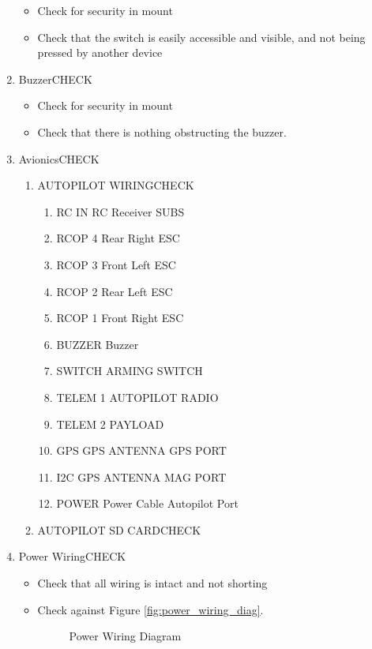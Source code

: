 \documentclass{report}
\begin{document}
\begin{enumerate}
\begin{itemize}
					\item Check for security in mount
					\item Check that the switch is easily accessible and visible, and not being pressed by another device
				\end{itemize}
			\item Buzzer\hrulefill CHECK
				\begin{itemize}
					\item Check for security in mount
					\item Check that there is nothing obstructing the buzzer.
				\end{itemize}
			\item Avionics\hrulefill CHECK
				\begin{enumerate}
					\item AUTOPILOT WIRING\hrulefill CHECK
						\begin{enumerate}
							\item RC IN \dotfill RC Receiver SUBS
							\item RCOP 4 \dotfill Rear Right ESC
							\item RCOP 3 \dotfill Front Left ESC
							\item RCOP 2 \dotfill Rear Left ESC
							\item RCOP 1 \dotfill Front Right ESC
							\item BUZZER \dotfill Buzzer
							\item SWITCH \dotfill ARMING SWITCH
							\item TELEM 1 \dotfill AUTOPILOT RADIO
							\item TELEM 2 \dotfill PAYLOAD
							\item GPS \dotfill GPS ANTENNA GPS PORT
							\item I2C \dotfill GPS ANTENNA MAG PORT
							\item POWER \dotfill Power Cable Autopilot Port
						\end{enumerate}
					\item AUTOPILOT SD CARD\hrulefill CHECK
				\end{enumerate}
			\item Power Wiring\hrulefill CHECK
				\begin{itemize}
					\item Check that all wiring is intact and not shorting
					\item Check against Figure \ref{fig:power_wiring_diag}.
						\begin{figure}[ht]
							\centering
							\caption{Power Wiring Diagram}

\end{figure}
\end{itemize}
\end{enumerate}
\end{document}

